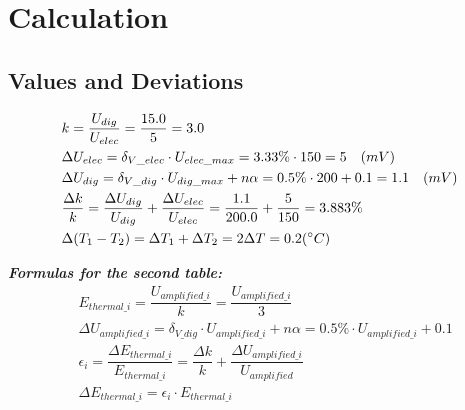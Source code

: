 \documentclass[12pt, a4paper]{article}
\newcommand{\Dt}{\Delta}
\newcommand{\hi}{\section}
\newcommand{\hii}{\subsection}
\begin{document}
\hi{Calculation}
    \hii{Values and Deviations}
    \begin{align*}
        &k = \dfrac{U_{dig}}{U_{elec}} = \dfrac{15.0}{5} = 3.0 \\
        &\Dt U_{elec} = \delta_{V\_elec} \cdot U_{elec\_max} = 3.33 \% \cdot 150 = 5 \quad (mV) \\
        &\Dt U_{dig} = \delta_{V\_dig} \cdot U_{dig\_max} + n \alpha
        = 0.5 \% \cdot 200 + 0.1 = 1.1 \quad (mV) \\
        &\dfrac{\Dt k}{k} = \dfrac{\Dt U_{dig}}{U_{dig}} + \dfrac{\Dt U_{elec}}{U_{elec}}
        = \dfrac{1.1}{200.0} + \dfrac{5}{150} = 3.883 \% \\
        &\Dt (T_{1} - T_{2}) = \Dt T_{1} + \Dt T_{2} = 2 \Dt T = 0.2 (\degree C)
    \end{align*}
    \pagebreak
    \par \textbf{\textit{Formulas for the second table:}} \\
    \begin{align*}
        &E_{thermal\_i} = \dfrac{U_{amplified\_i}}{k} = \dfrac{U_{amplified\_i}}{3}  \\
        &\Dt U_{amplified\_i} = \delta_{V\_dig} \cdot U_{amplified\_i} + n \alpha
        = 0.5 \% \cdot U_{amplified\_i} + 0.1 \\
        &\epsilon_{i} = \dfrac{\Dt E_{thermal\_i}}{E_{thermal\_i}}
        = \dfrac{\Dt{k}}{k} + \dfrac{\Dt U_{amplified\_i}}{U_{amplified}} \\
        &\Dt E_{thermal\_i} = \epsilon_{i} \cdot E_{thermal\_i} \\
    \end{align*}
\end{document}
